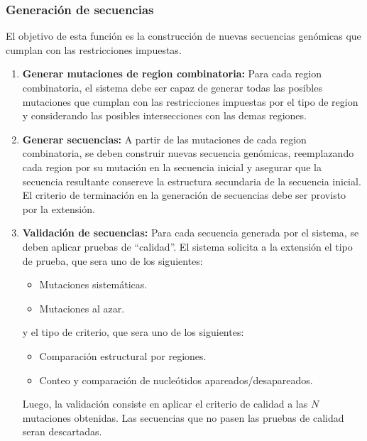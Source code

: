 \documentclass[10pt,a4paper]{article}
\begin{document}
  \subsubsection{Generaci\'on de secuencias}
  El objetivo de esta funci\'on es la construcci\'on de nuevas secuencias gen\'omicas que cumplan con las restricciones impuestas.
  \begin{enumerate}
    \item \textbf{Generar mutaciones de region combinatoria:}
    Para cada region combinatoria, el sistema debe ser capaz de generar todas las posibles mutaciones que cumplan con las restricciones impuestas por el tipo de region y considerando las posibles intersecciones con las demas regiones.
    
    \item \textbf{Generar secuencias:}
    A partir de las mutaciones de cada region combinatoria, se deben construir nuevas secuencia gen\'omicas, reemplazando cada region por su mutaci\'on en la secuencia inicial y asegurar que la secuencia resultante consereve la estructura secundaria de la secuencia inicial. El criterio de terminaci\'on en la generaci\'on de secuencias debe ser provisto por la extensi\'on.

    \item \textbf{Validaci\'on de secuencias:}
    Para cada secuencia generada por el sistema, se deben aplicar pruebas de ``calidad''. El sistema solicita a la extensi\'on el tipo de prueba, que sera uno de los siguientes:
      \begin{itemize}
        \item Mutaciones sistem\'aticas.
	\item Mutaciones al azar.
      \end{itemize}
    y el tipo de criterio, que sera uno de los siguientes:
      \begin{itemize}
        \item Comparaci\'on estructural por regiones.
	\item Conteo y comparaci\'on de nucle\'otidos apareados/desapareados.
      \end{itemize}
    Luego, la validaci\'on consiste en aplicar el criterio de calidad a las $N$ mutaciones obtenidas. Las secuencias que no pasen las pruebas de calidad seran descartadas.
  \end{enumerate}
\end{document}
